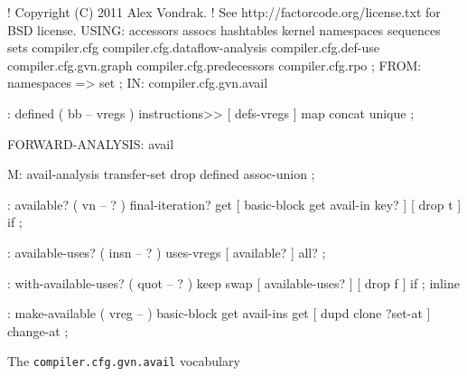 \centering

  \begin{factorcode}
    ! Copyright (C) 2011 Alex Vondrak.
    ! See http://factorcode.org/license.txt for BSD license.
    USING: accessors assocs hashtables kernel namespaces sequences
    sets
    compiler.cfg
    compiler.cfg.dataflow-analysis
    compiler.cfg.def-use
    compiler.cfg.gvn.graph
    compiler.cfg.predecessors
    compiler.cfg.rpo ;
    FROM: namespaces => set ;
    IN: compiler.cfg.gvn.avail

    : defined ( bb -- vregs )
        instructions>> [ defs-vregs ] map concat unique ;

    FORWARD-ANALYSIS: avail

    M: avail-analysis transfer-set drop defined assoc-union ;

    : available? ( vn -- ? )
        final-iteration? get [
            basic-block get avail-in key?
        ] [ drop t ] if ;

    : available-uses? ( insn -- ? )
        uses-vregs [ available? ] all? ;

    : with-available-uses? ( quot -- ? )
        keep swap [ available-uses? ] [ drop f ] if ; inline

    : make-available ( vreg -- )
        basic-block get avail-ins get [ dupd clone ?set-at ] change-at ;
  \end{factorcode}

\caption{The \texttt{compiler.cfg.gvn.avail} vocabulary}
